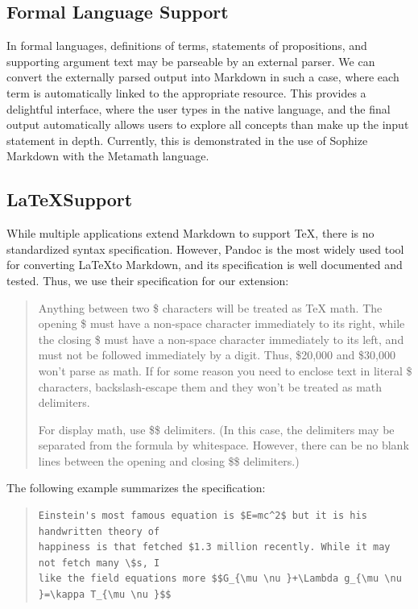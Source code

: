 \documentclass[a4paper]{article}
\begin{document}
\subsection{Formal Language Support}

In formal languages, definitions of terms, statements of propositions, and supporting argument text may be parseable by an external parser. We can convert the externally parsed output into Markdown in such a case, where each term is automatically linked to the appropriate resource. This provides a delightful interface, where the user types in the native language, and the final output automatically allows users to explore all concepts than make up the input statement in depth. Currently, this is demonstrated in the use of Sophize Markdown with the Metamath language.

\subsection{\LaTeX\space Support}

While multiple applications extend Markdown to support TeX, there is no standardized syntax specification. However, Pandoc is the most widely used tool for converting \LaTeX\space to Markdown, and its specification is well documented and tested. Thus, we use their specification for our extension\cite{pandoc}:


\blockquote{Anything between two \$ characters will be treated as TeX math. The opening \$ must have a non-space character immediately to its right, while the closing \$ must have a non-space character immediately to its left, and must not be followed immediately by a digit. Thus, \$20,000 and \$30,000 won’t parse as math. If for some reason you need to enclose text in literal \$ characters, backslash-escape them and they won’t be treated as math delimiters.


For display math, use \$\$ delimiters. (In this case, the delimiters may be separated from the formula by whitespace. However, there can be no blank lines between the opening and closing \$\$ delimiters.)}


The following example summarizes the specification:
\begin{quote}
\begin{verbatim} 
Einstein's most famous equation is $E=mc^2$ but it is his handwritten theory of 
happiness is that fetched $1.3 million recently. While it may not fetch many \$s, I 
like the field equations more $$G_{\mu \nu }+\Lambda g_{\mu \nu }=\kappa T_{\mu \nu }$$
\end{verbatim}
\end{quote}
\end{document}
